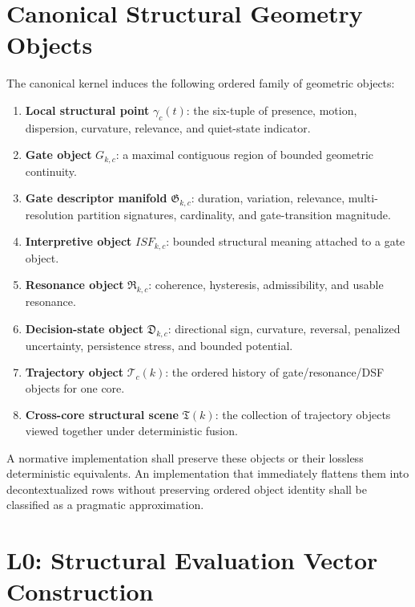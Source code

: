 \section{Canonical Structural Geometry Objects}

The canonical kernel induces the following ordered family of geometric objects:
\begin{enumerate}[leftmargin=1.2cm]
    \item \textbf{Local structural point} $\gamma_c(t)$: the six-tuple of presence, motion, dispersion, curvature, relevance, and quiet-state indicator.
    \item \textbf{Gate object} $G_{k,c}$: a maximal contiguous region of bounded geometric continuity.
    \item \textbf{Gate descriptor manifold} $\mathfrak{G}_{k,c}$: duration, variation, relevance, multi-resolution partition signatures, cardinality, and gate-transition magnitude.
    \item \textbf{Interpretive object} $ISF_{k,c}$: bounded structural meaning attached to a gate object.
    \item \textbf{Resonance object} $\mathfrak{R}_{k,c}$: coherence, hysteresis, admissibility, and usable resonance.
    \item \textbf{Decision-state object} $\mathfrak{D}_{k,c}$: directional sign, curvature, reversal, penalized uncertainty, persistence stress, and bounded potential.
    \item \textbf{Trajectory object} $\mathcal{T}_{c}(k)$: the ordered history of gate/resonance/DSF objects for one core.
    \item \textbf{Cross-core structural scene} $\mathfrak{T}(k)$: the collection of trajectory objects viewed together under deterministic fusion.
\end{enumerate}

A normative implementation shall preserve these objects or their lossless deterministic equivalents. An implementation that immediately flattens them into decontextualized rows without preserving ordered object identity shall be classified as a pragmatic approximation.

\section{L0: Structural Evaluation Vector Construction}

